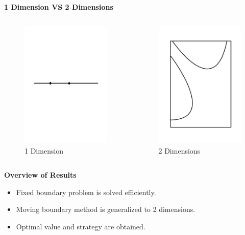 \documentclass{beamer}
\begin{document}
%
\begin{frame}
{\bf 1 Dimension VS 2 Dimensions}
\begin{columns}

   \begin{figure}[hbt]
   \includegraphics[width = 5cm]{1D.pdf}
   \caption{1 Dimension}
   \end{figure}
 
  \begin{figure}[hbt]
  \includegraphics[width = 5cm]{2D1.pdf}
  \caption{2 Dimensions}
  \end{figure}
\end{columns}

\end{frame}



\begin{frame}
{\bf Overview of Results}
\begin{itemize}
  \item Fixed boundary problem is solved efficiently. 
  \item Moving boundary method is generalized to 2 dimensions.
  \item Optimal value and strategy are obtained.
\end{itemize}

\end{frame}
\end{document}
